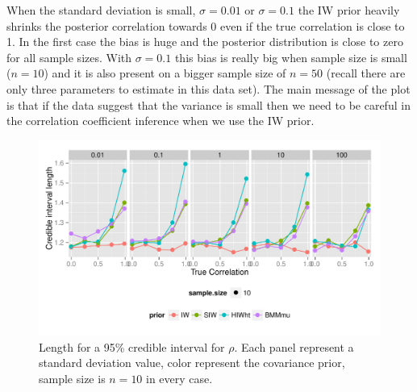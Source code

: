 \documentclass[a4paper]{article}
\begin{document}
When the standard deviation is small, $\sigma=0.01$ or $\sigma=0.1$ the IW prior heavily shrinks the posterior correlation towards 0 even if the true correlation is close to 1. In the first case the bias is huge and the posterior distribution is close to zero for all sample sizes.  With $\sigma=0.1$ this bias is really big when sample size is small ($n=10$) and it is also present on a bigger sample size of $n=50$ (recall there are only three parameters to estimate in this data set). The main message of the plot is that if the data suggest that the variance is small then we need to be careful in the correlation coefficient inference when we use the IW prior. 
\begin{figure}[htbp]
   \centering
   \includegraphics[width=\textwidth]{cilength} %
    \vspace{-.5in}
   \caption{Length for a 95\% credible interval for $\rho$. Each panel represent a standard deviation value,  color represent the covariance prior, sample size is $n=10$ in every case.  \label{cilength}}
\end{figure}
\end{document}
